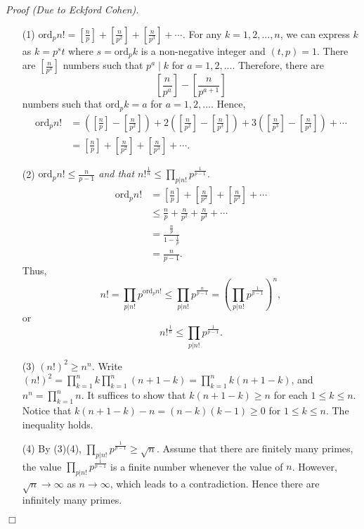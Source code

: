 \documentclass{article}
\begin{document}
\emph{Proof (Due to Eckford Cohen).}
\begin{enumerate}
\item[(1)]
\emph{$\text{ord}_p n!
= \left[\frac{n}{p}\right] + \left[\frac{n}{p^2}\right] + \left[\frac{n}{p^3}\right] + \cdots$.}
For any $k = 1, 2, ..., n$, we can express $k$ as $k = p^s t$
where $s = \text{ord}_p k$ is a non-negative integer and $(t, p) = 1$.
There are $[\frac{n}{p^a}]$ numbers such that $p^a \mid k$ for $a = 1, 2, ...$.
Therefore, there are $$\left[\frac{n}{p^a}\right] - \left[\frac{n}{p^{a+1}}\right]$$
numbers such that $\text{ord}_p k = a$ for $a = 1, 2, ...$. Hence,
\begin{align*}
\text{ord}_p n!
&= \left( \left[\frac{n}{p}\right] - \left[\frac{n}{p^2}\right] \right)
 + 2 \left( \left[\frac{n}{p^2}\right] - \left[\frac{n}{p^3}\right] \right)
 + 3 \left( \left[\frac{n}{p^3}\right] - \left[\frac{n}{p^4}\right] \right) + \cdots \\
&= \left[\frac{n}{p}\right] + \left[\frac{n}{p^2}\right] + \left[\frac{n}{p^3}\right] + \cdots.
\end{align*}
\item[(2)]
\emph{$\text{ord}_p n! \leq \frac{n}{p - 1}$ and that
$n!^{\frac{1}{n}} \leq \prod_{p|n!}p^{\frac{1}{p - 1}}$.}
\begin{align*}
\text{ord}_p n!
&= \left[\frac{n}{p}\right] + \left[\frac{n}{p^2}\right] + \left[\frac{n}{p^3}\right] + \cdots \\
&\leq \frac{n}{p} + \frac{n}{p^2} + \frac{n}{p^3} + \cdots \\
&= \frac{\frac{n}{p}}{1 - \frac{1}{p}} \\
&= \frac{n}{p - 1}.
\end{align*}
Thus,
$$n!
= \prod_{p|n!} p^{\text{ord}_p n!}
\leq \prod_{p|n!} p^{\frac{n}{p - 1}}
= \left( \prod_{p|n!} p^{\frac{1}{p - 1}} \right)^n, $$
or
$$n!^{\frac{1}{n}} \leq \prod_{p|n!}p^{\frac{1}{p - 1}}.$$
\item[(3)]
\emph{$(n!)^2 \geq n^n$.}
Write
$(n!)^2 = \prod_{k=1}^n k \prod_{k=1}^n (n + 1 - k) = \prod_{k=1}^n k(n + 1 - k)$,
and $n^n = \prod_{k=1}^n n$.
It suffices to show that $k(n + 1 - k) \geq n$ for each $1 \leq k \leq n$.
Notice that $k(n + 1 - k) - n = (n - k)(k - 1) \geq 0$ for $1 \leq k \leq n$.
The inequality holds.
\item[(4)]
By (3)(4), $\prod_{p|n!}p^{\frac{1}{p - 1}} \geq \sqrt{n}$.
Assume that there are finitely many primes,
the value $\prod_{p|n!} p^{\frac{1}{p - 1}}$ is a finite number
whenever the value of $n$.
However, $\sqrt{n} \rightarrow \infty$ as $n \rightarrow \infty$,
which leads to a contradiction.
Hence there are infinitely many primes.
\end{enumerate}
$\Box$ \\
\end{document}

